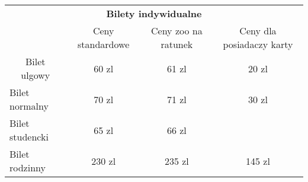\begin{tabular}{lccc}
\multicolumn{4}{c}{\textbf{Bilety indywidualne}}                                                      \\
\multicolumn{1}{c}{}             & Ceny standardowe & Ceny zoo na ratunek & Ceny dla posiadaczy karty \\
\multicolumn{1}{c}{Bilet ulgowy} & 60 zl            & 61 zl               & 20 zl                     \\
Bilet normalny                   & 70 zl            & 71 zl               & 30 zl                     \\
Bilet studencki                  & 65 zl            & 66 zl               &                           \\
Bilet rodzinny                   & 230 zl           & 235 zl              & 145 zl                   
\end{tabular}